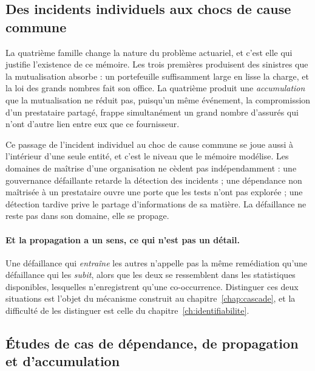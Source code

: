 \subsection{Des incidents individuels aux chocs de cause commune}

La quatrième famille change la nature du problème actuariel, et c'est elle qui justifie
l'existence de ce mémoire. Les trois premières produisent des sinistres que la mutualisation
absorbe : un portefeuille suffisamment large en lisse la charge, et la loi des grands nombres
fait son office. La quatrième produit une \emph{accumulation} que la mutualisation ne réduit
pas, puisqu'un même événement, la compromission d'un prestataire partagé, frappe simultanément
un grand nombre d'assurés qui n'ont d'autre lien entre eux que ce fournisseur.

Ce passage de l'incident individuel au choc de cause commune se joue aussi à l'intérieur d'une
seule entité, et c'est le niveau que le mémoire modélise. Les domaines de maîtrise d'une
organisation ne cèdent pas indépendamment : une gouvernance défaillante retarde la détection des
incidents ; une dépendance non maîtrisée à un prestataire ouvre une porte que les tests n'ont pas
explorée ; une détection tardive prive le partage d'informations de sa matière. La défaillance
ne reste pas dans son domaine, elle se propage.

\paragraph{Et la propagation a un sens, ce qui n'est pas un détail.} Une défaillance qui
\emph{entraîne} les autres n'appelle pas la même remédiation qu'une défaillance qui les
\emph{subit}, alors que les deux se ressemblent dans les statistiques disponibles, lesquelles
n'enregistrent qu'une co-occurrence. Distinguer ces deux situations est l'objet du mécanisme
construit au chapitre~\ref{chap:cascade}, et la difficulté de les distinguer est celle du
chapitre~\ref{ch:identifiabilite}.

\subsection{Études de cas de dépendance, de propagation et d'accumulation}
\label{subsec:cas-cyber}

